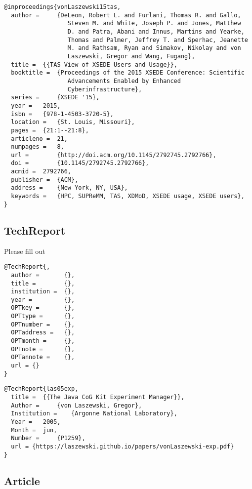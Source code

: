 \begin{verbatim}
@inproceedings{vonLaszewski15tas,
  author =     {DeLeon, Robert L. and Furlani, Thomas R. and Gallo,
                  Steven M. and White, Joseph P. and Jones, Matthew
                  D. and Patra, Abani and Innus, Martins and Yearke,
                  Thomas and Palmer, Jeffrey T. and Sperhac, Jeanette
                  M. and Rathsam, Ryan and Simakov, Nikolay and von
                  Laszewski, Gregor and Wang, Fugang},
  title =  {{TAS View of XSEDE Users and Usage}},
  booktitle =  {Proceedings of the 2015 XSEDE Conference: Scientific
                  Advancements Enabled by Enhanced
                  Cyberinfrastructure},
  series =     {XSEDE '15},
  year =   2015,
  isbn =   {978-1-4503-3720-5},
  location =   {St. Louis, Missouri},
  pages =  {21:1--21:8},
  articleno =  21,
  numpages =   8,
  url =        {http://doi.acm.org/10.1145/2792745.2792766},
  doi =        {10.1145/2792745.2792766},
  acmid =  2792766,
  publisher =  {ACM},
  address =    {New York, NY, USA},
  keywords =   {HPC, SUPReMM, TAS, XDMoD, XSEDE usage, XSEDE users},
}
\end{verbatim}

\subsection{TechReport}\label{s:e:techreport}

Please fill out

\begin{verbatim}
@TechReport{,
  author =       {},
  title =        {},
  institution =  {},
  year =         {},
  OPTkey =       {},
  OPTtype =      {},
  OPTnumber =    {},
  OPTaddress =   {},
  OPTmonth =     {},
  OPTnote =      {},
  OPTannote =    {},
  url = {}    
}
\end{verbatim}

\begin{verbatim}
@TechReport{las05exp,
  title =  {{The Java CoG Kit Experiment Manager}},
  Author =     {von Laszewski, Gregor},
  Institution =    {Argonne National Laboratory},
  Year =   2005,
  Month =  jun,
  Number =     {P1259},
  url = {https://laszewski.github.io/papers/vonLaszewski-exp.pdf}
}
\end{verbatim}

\subsection{Article}


